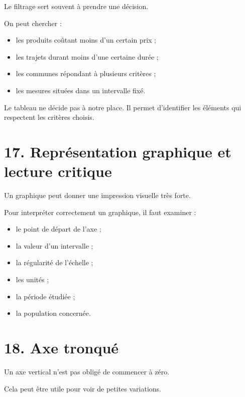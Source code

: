 Le filtrage sert souvent à prendre une décision.

On peut chercher :
\begin{itemize}
\item les produits coûtant moins d'un certain prix ;
\item les trajets durant moins d'une certaine durée ;
\item les communes répondant à plusieurs critères ;
\item les mesures situées dans un intervalle fixé.
\end{itemize}

\begin{attention}
Le tableau ne décide pas à notre place. Il permet d'identifier les éléments qui respectent les critères choisis.
\end{attention}

\section{17. Représentation graphique et lecture critique}

Un graphique peut donner une impression visuelle très forte.


Pour interpréter correctement un graphique, il faut examiner :
\begin{itemize}
\item le point de départ de l'axe ;
\item la valeur d'un intervalle ;
\item la régularité de l'échelle ;
\item les unités ;
\item la période étudiée ;
\item la population concernée.
\end{itemize}

\section{18. Axe tronqué}

Un axe vertical n'est pas obligé de commencer à zéro.

Cela peut être utile pour voir de petites variations.

